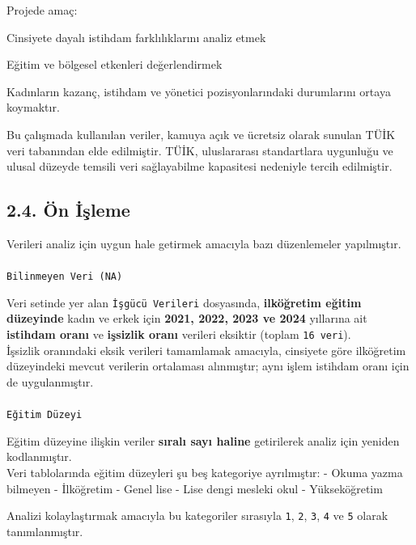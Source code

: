 \documentclass[
  11pt,
  a4paper,
  DIV=11,
  numbers=noendperiod]{scrartcl}
\makeatletter
\let\oldparagraph\paragraph
\renewcommand{\paragraph}{
    \@ifstar
      \xxxParagraphStar
      \xxxParagraphNoStar
  }
\newcommand{\xxxParagraphStar}[1]{\oldparagraph*{#1}\mbox{}}
\newcommand{\xxxParagraphNoStar}[1]{\oldparagraph{#1}\mbox{}}
\makeatother
\begin{document}
Projede amaç:

Cinsiyete dayalı istihdam farklılıklarını analiz etmek

Eğitim ve bölgesel etkenleri değerlendirmek

Kadınların kazanç, istihdam ve yönetici pozisyonlarındaki durumlarını
ortaya koymaktır.

Bu çalışmada kullanılan veriler, kamuya açık ve ücretsiz olarak sunulan
TÜİK veri tabanından elde edilmiştir. TÜİK, uluslararası standartlara
uygunluğu ve ulusal düzeyde temsili veri sağlayabilme kapasitesi
nedeniyle tercih edilmiştir.

\subsection{2.4. Ön İşleme}\label{uxf6n-iux15fleme}

Verileri analiz için uygun hale getirmek amacıyla bazı düzenlemeler
yapılmıştır.

\paragraph{\texorpdfstring{\texttt{Bilinmeyen\ Veri\ (NA)}}{Bilinmeyen Veri (NA)}}\label{bilinmeyen-veri-na}

Veri setinde yer alan \texttt{İşgücü\ Verileri} dosyasında,
\textbf{ilköğretim eğitim düzeyinde} kadın ve erkek için \textbf{2021,
2022, 2023 ve 2024} yıllarına ait \textbf{istihdam oranı} ve
\textbf{işsizlik oranı} verileri eksiktir (toplam \texttt{16\ veri}).\\
İşsizlik oranındaki eksik verileri tamamlamak amacıyla, cinsiyete göre
ilköğretim düzeyindeki mevcut verilerin ortalaması alınmıştır; aynı
işlem istihdam oranı için de uygulanmıştır.

\paragraph{\texorpdfstring{\texttt{Eğitim\ Düzeyi}}{Eğitim Düzeyi}}\label{eux11fitim-duxfczeyi}

Eğitim düzeyine ilişkin veriler \textbf{sıralı sayı haline} getirilerek
analiz için yeniden kodlanmıştır.\\
Veri tablolarında eğitim düzeyleri şu beş kategoriye ayrılmıştır: -
Okuma yazma bilmeyen - İlköğretim - Genel lise - Lise dengi mesleki okul
- Yükseköğretim

Analizi kolaylaştırmak amacıyla bu kategoriler sırasıyla \texttt{1},
\texttt{2}, \texttt{3}, \texttt{4} ve \texttt{5} olarak tanımlanmıştır.
\end{document}
